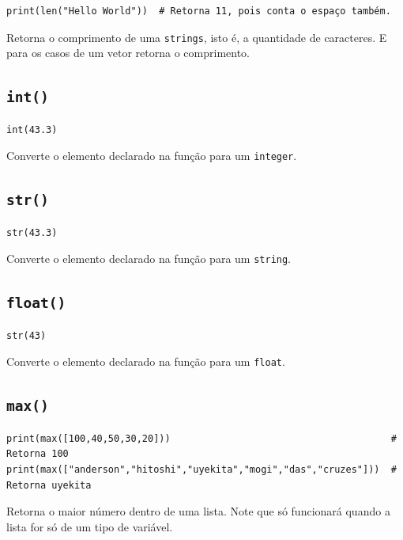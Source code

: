 \documentclass[]{book}
\begin{document}
\begin{verbatim}
print(len("Hello World"))  # Retorna 11, pois conta o espaço também.
\end{verbatim}

Retorna o comprimento de uma \texttt{strings}, isto é, a quantidade de
caracteres. E para os casos de um vetor retorna o comprimento.

\subsection{\texorpdfstring{\texttt{int()}}{int()}}\label{int}

\begin{verbatim}
int(43.3)
\end{verbatim}

Converte o elemento declarado na função para um \texttt{integer}.

\subsection{\texorpdfstring{\texttt{str()}}{str()}}\label{str}

\begin{verbatim}
str(43.3)
\end{verbatim}

Converte o elemento declarado na função para um \texttt{string}.

\subsection{\texorpdfstring{\texttt{float()}}{float()}}\label{float}

\begin{verbatim}
str(43)
\end{verbatim}

Converte o elemento declarado na função para um \texttt{float}.

\subsection{\texorpdfstring{\texttt{max()}}{max()}}\label{max}

\begin{verbatim}
print(max([100,40,50,30,20]))                                       # Retorna 100
print(max(["anderson","hitoshi","uyekita","mogi","das","cruzes"]))  # Retorna uyekita
\end{verbatim}

Retorna o maior número dentro de uma lista. Note que só funcionará
quando a lista for só de um tipo de variável.
\end{document}
